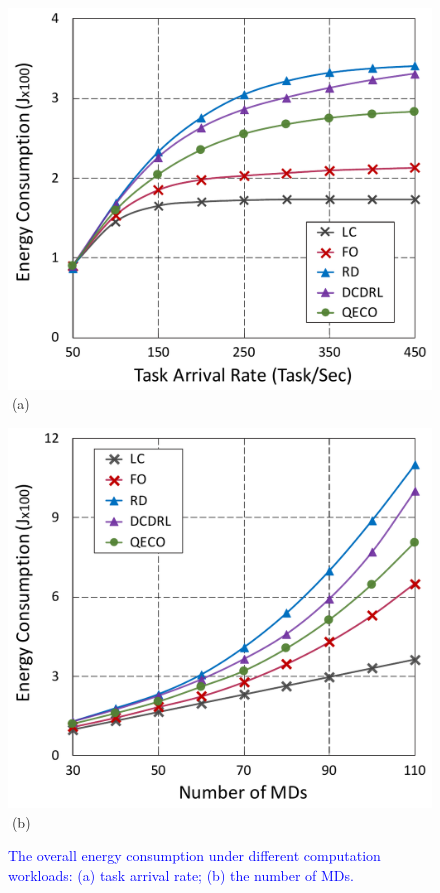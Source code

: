 \documentclass[10pt, journal,letterpaper]{IEEEtran}
\begin{document}
\begin{figure}[tbp]
	\captionsetup{name=Fig.}
	\begin{minipage}[b]{0.50\linewidth}
		\centering
		\includegraphics[width=\textwidth]{ energy_1} 		
		\textcolor{white}{i}\hspace{0.6cm}(a)
	\end{minipage}
	\hspace{-0.2cm}
	\begin{minipage}[b]{0.50\linewidth}
		\centering
		\includegraphics[width=\textwidth]{ energy_2}
		\textcolor{white}{i}\hspace{0.6cm}(b)
	\end{minipage}
	\vspace{-0.7cm}
	\caption{\textcolor{blue}{The overall energy consumption under different computation workloads: (a) task arrival rate; (b) the number of MDs.}}
	\label{chart2}
\end{figure}
\end{document}
